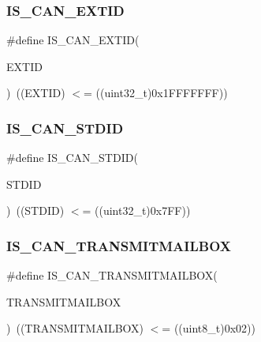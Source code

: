 \mbox{\label{group___c_a_n___tx_ga62dbc2163ad6751b3f921e717b00e9f2}} 
\subsubsection{\texorpdfstring{IS\_CAN\_EXTID}{IS\_CAN\_EXTID}}
{\footnotesize\ttfamily \#define I\+S\+\_\+\+C\+A\+N\+\_\+\+E\+X\+T\+ID(\begin{DoxyParamCaption}\item[{}]{E\+X\+T\+ID }\end{DoxyParamCaption})~((E\+X\+T\+ID) $<$= ((uint32\+\_\+t)0x1\+F\+F\+F\+F\+F\+F\+F))}

\mbox{\label{group___c_a_n___tx_gaf059e4383fa69dec6e18216b22a87f51}} 
\subsubsection{\texorpdfstring{IS\_CAN\_STDID}{IS\_CAN\_STDID}}
{\footnotesize\ttfamily \#define I\+S\+\_\+\+C\+A\+N\+\_\+\+S\+T\+D\+ID(\begin{DoxyParamCaption}\item[{}]{S\+T\+D\+ID }\end{DoxyParamCaption})~((S\+T\+D\+ID) $<$= ((uint32\+\_\+t)0x7\+F\+F))}

\mbox{\label{group___c_a_n___tx_ga218b3e1380c4d49163c91a1af904e44c}} 
\subsubsection{\texorpdfstring{IS\_CAN\_TRANSMITMAILBOX}{IS\_CAN\_TRANSMITMAILBOX}}
{\footnotesize\ttfamily \#define I\+S\+\_\+\+C\+A\+N\+\_\+\+T\+R\+A\+N\+S\+M\+I\+T\+M\+A\+I\+L\+B\+OX(\begin{DoxyParamCaption}\item[{}]{T\+R\+A\+N\+S\+M\+I\+T\+M\+A\+I\+L\+B\+OX }\end{DoxyParamCaption})~((T\+R\+A\+N\+S\+M\+I\+T\+M\+A\+I\+L\+B\+OX) $<$= ((uint8\+\_\+t)0x02))}

